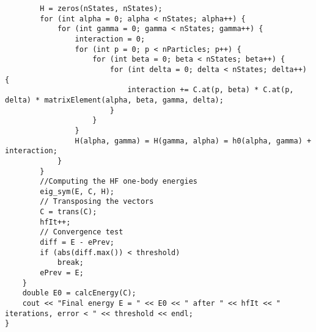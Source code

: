 \documentclass[11pt,a4wide]{article}
\begin{document}
\begin{enumerate}
\begin{lstlisting}
        H = zeros(nStates, nStates);
        for (int alpha = 0; alpha < nStates; alpha++) {
            for (int gamma = 0; gamma < nStates; gamma++) {
                interaction = 0;
                for (int p = 0; p < nParticles; p++) {
                    for (int beta = 0; beta < nStates; beta++) {
                        for (int delta = 0; delta < nStates; delta++) {
                            interaction += C.at(p, beta) * C.at(p, delta) * matrixElement(alpha, beta, gamma, delta);
                        }
                    }
                }
                H(alpha, gamma) = H(gamma, alpha) = h0(alpha, gamma) + interaction;
            }
        }
        //Computing the HF one-body energies
        eig_sym(E, C, H);
        // Transposing the vectors
        C = trans(C);
        hfIt++;
        // Convergence test
        diff = E - ePrev;
        if (abs(diff.max()) < threshold)
            break;
        ePrev = E;
    }
    double E0 = calcEnergy(C);
    cout << "Final energy E = " << E0 << " after " << hfIt << " iterations, error < " << threshold << endl;
}
\end{lstlisting}

\end{enumerate}
\end{document}
